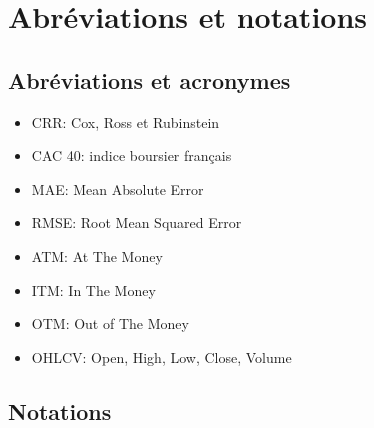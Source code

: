 \documentclass[11pt]{report}
\begin{document}
\newpage


\chapter*{Abréviations et notations}

\section*{Abréviations et acronymes}

\begin{center}
	\begin{minipage}[t]{0.49\textwidth}
		\begin{itemize}[noitemsep]
			\raggedright
			\item CRR: Cox, Ross et Rubinstein
			\item CAC 40: indice boursier français
			\item MAE: Mean Absolute Error
			\item RMSE: Root Mean Squared Error
		\end{itemize}
	\end{minipage}
	\hfill
	\begin{minipage}[t]{0.49\textwidth}
		\begin{itemize}[noitemsep]
			\raggedright
			\item ATM: At The Money
			\item ITM: In The Money
			\item OTM: Out of The Money
			\item OHLCV: Open, High, Low, Close, Volume
		\end{itemize}
	\end{minipage}
\end{center}

\section*{Notations}
\end{document}
